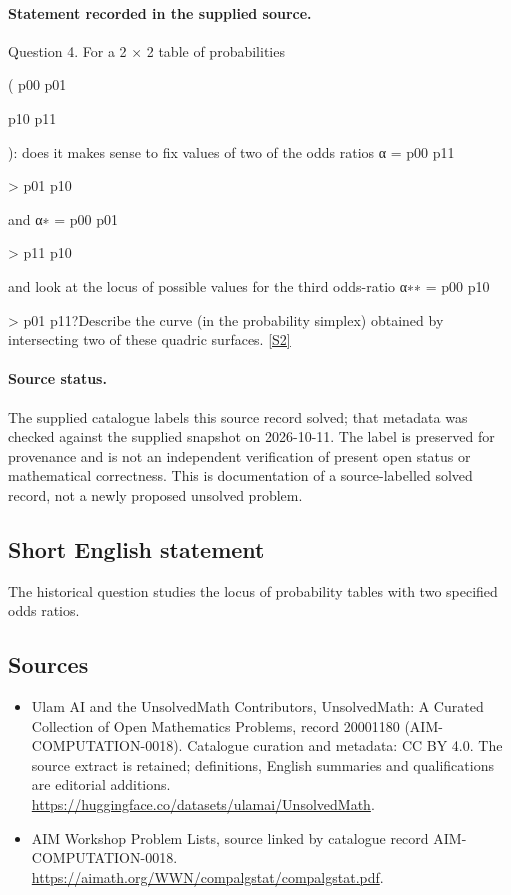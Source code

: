 \documentclass[11pt]{article}
\begin{document}
\paragraph{Statement recorded in the supplied source.}
Question 4. For a 2 × 2 table of probabilities

( p00 p01

p10 p11

): does it makes sense to fix values of two of the odds ratios α = p00 p11

> p01 p10

and α∗ = p00 p01

> p11 p10

and look at the locus of possible values for the third odds-ratio α∗∗ = p00 p10

> p01 p11?Describe the curve (in the probability simplex) obtained by intersecting two of these quadric surfaces. \href{https://aimath.org/WWN/compalgstat/compalgstat.pdf}{[S2]}
\paragraph{Source status.}
The supplied catalogue labels this source record solved; that metadata was checked against the supplied snapshot on 2026-10-11. The label is preserved for provenance and is not an independent verification of present open status or mathematical correctness. This is documentation of a source-labelled solved record, not a newly proposed unsolved problem.
\subsection{Short English statement}
The historical question studies the locus of probability tables with two specified odds ratios.
\subsection{Sources}
\begin{itemize}
\item[S1] Ulam AI and the UnsolvedMath Contributors, UnsolvedMath: A Curated Collection of Open Mathematics Problems, record 20001180 (AIM-COMPUTATION-0018). Catalogue curation and metadata: CC BY 4.0. The source extract is retained; definitions, English summaries and qualifications are editorial additions.
\url{https://huggingface.co/datasets/ulamai/UnsolvedMath}.
\item[S2] AIM Workshop Problem Lists, source linked by catalogue record AIM-COMPUTATION-0018.
\url{https://aimath.org/WWN/compalgstat/compalgstat.pdf}.
\end{itemize}
\end{document}

